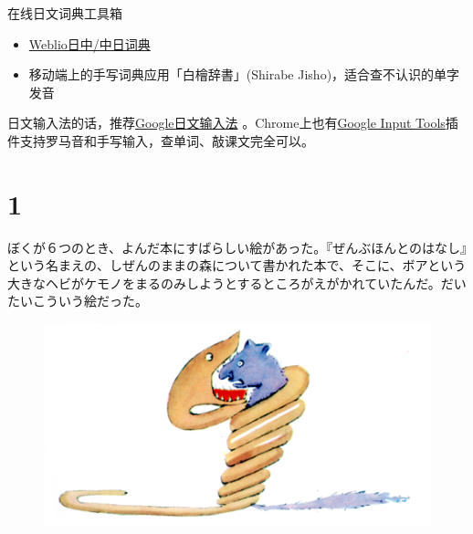     \parStar 在线日文词典工具箱
    \begin{itemize}
        \setlength\itemsep{0.5em}
        
        \item \href{https://cjjc.weblio.jp/}{Weblio日中/中日词典}
        
        \item 移动端上的手写词典应用「白檜辞書」(Shirabe Jisho)，适合查不认识的单字发音
    \end{itemize}
    
    \parStar 日文输入法的话，推荐\href{https://www.google.co.jp/ime/}{Google日文输入法} 。Chrome上也有\href{https://chrome.google.com/webstore/detail/google-input-tools/mclkkofklkfljcocdinagocijmpgbhab/related}{Google Input Tools}插件支持罗马音和手写输入，查单词、敲课文完全可以。

\newpage
{}
\setcounter{page}{1}

\fancyhf{} %
\fancyhead[LE,RO]{\leftmark}
\fancyfoot[C]{\thepage}

\section{1}
ぼくが６つのとき、よんだ本にすばらしい絵があった。『ぜんぶほんとのはなし』という名まえの、しぜんのままの森について書かれた本で、そこに、ボアという大きなヘビがケモノをまるのみしようとするところがえがかれていたんだ。だいたいこういう絵だった。

\begin{figure}
    \centering
    \includegraphics{fig46817_02.png}
\end{figure}



